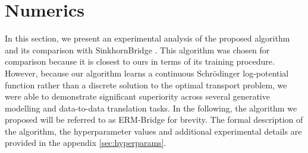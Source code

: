 \documentclass[11pt]{article}
\theoremstyle{remark}
\numberwithin{equation}{section}
\newcommand{\R}{\mathbb{R}}
\begin{document}


\section{Numerics} \label{sec:numerical}

In this section, we present an experimental analysis of the proposed algorithm and its comparison with SinkhornBridge \citep{PooladianNilesWeed2024}. This algorithm was chosen for comparison because it is closest to ours in terms of its training procedure. However, because our algorithm learns a continuous Schrödinger log-potential function rather than a discrete solution to the optimal transport problem, we were able to demonstrate significant superiority across several generative modelling and data-to-data translation tasks.  
In the following, the algorithm we proposed will be referred to as ERM-Bridge for brevity. The formal description of the algorithm, the hyperparameter values and additional experimental details are provided in the appendix \ref{sec:hyperparams}.
\end{document}
